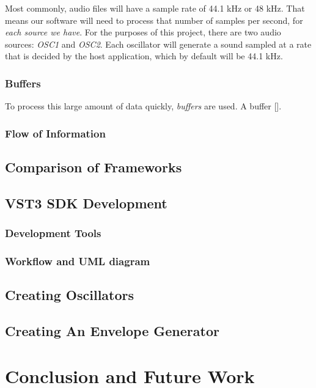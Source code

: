 \documentclass[12pt]{article}
\begin{document}
Most commonly, audio files will have a sample rate of 44.1 kHz or 48 kHz. That means our software will need to process that number of samples per second, for \textit{each source we have}. For the purposes of this project, there are two audio sources: \textit{OSC1} and \textit{OSC2}. Each oscillator will generate a sound sampled at a rate that is decided by the host application, which by default will be 44.1 kHz.

\subsubsection{Buffers}
To process this large amount of data quickly, \textit{buffers} are used. A buffer [].

\subsubsection{Flow of Information}

\subsection{Comparison of Frameworks}

\subsection{VST3 SDK Development}

\subsubsection{Development Tools}

\subsubsection{Workflow and UML diagram}

\subsection{Creating Oscillators}

\subsection{Creating An Envelope Generator}

\section{Conclusion and Future Work}




\end{document}
